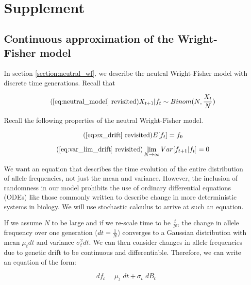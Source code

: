 \chapter{Supplement}
\section{Continuous approximation of the Wright-Fisher model}
In section \ref{section:neutral_wf}, we describe the neutral Wright-Fisher model with discrete time generations. Recall that 

\begin{equation}
    \tag{\ref{eq:neutral_model} revisited}
    X_{t+1} | f_t \sim Binom(N,\frac{X_t}{N})
\end{equation}

Recall the following properties of the neutral Wright-Fisher model. 

\begin{equation}
    \tag{\ref{eq:ex_drift} revisited}
    E[f_t] = f_0
\end{equation}

\begin{equation}
    \tag{\ref{eq:var_lim_drift} revisited}
    \lim_{N \to \infty} Var[f_{t+1}|f_t] = 0
\end{equation}


We want an equation that describes the time evolution of the entire distribution of allele frequencies, not just the mean and variance. However, the inclusion of randomness in our model prohibits the use of ordinary differential equations (ODEs) like those commonly written to describe change in more deterministic systems in biology. We will use stochastic calculus to arrive at such an equation.


If we assume $N$ to be large and if we re-scale time to be $\frac{t}{N}$, the change in allele frequency over one generation ($dt=\frac{1}{N}$) converges to a Gaussian distribution with mean $\mu_t dt$ and variance $\sigma^2_t dt$. We can then consider changes in allele frequencies due to genetic drift to be continuous and differentiable. Therefore, we can write an equation of the form: 

\begin{equation}
    df_t = \mu_t \, \,dt + \sigma_t \, \,dB_t
\end{equation}


